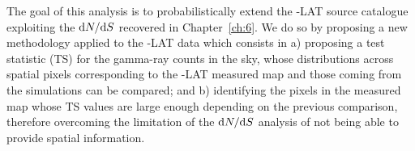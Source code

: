 The goal of this analysis is to probabilistically extend the \Fermi-LAT source catalogue exploiting the $\textrm{d}N/\textrm{d}S$ recovered in Chapter~\ref{ch:6}. We do so by proposing a new methodology applied to the \Fermi-LAT data which consists in a) proposing a test statistic (TS) for the gamma-ray counts in the sky, whose distributions across spatial pixels corresponding to the \Fermi-LAT measured map and those coming from the simulations can be compared; and b) identifying the pixels in the measured map whose TS values are large enough depending on the previous comparison, therefore overcoming the limitation of the $\textrm{d}N/\textrm{d}S$ analysis of not being able to provide spatial information.

